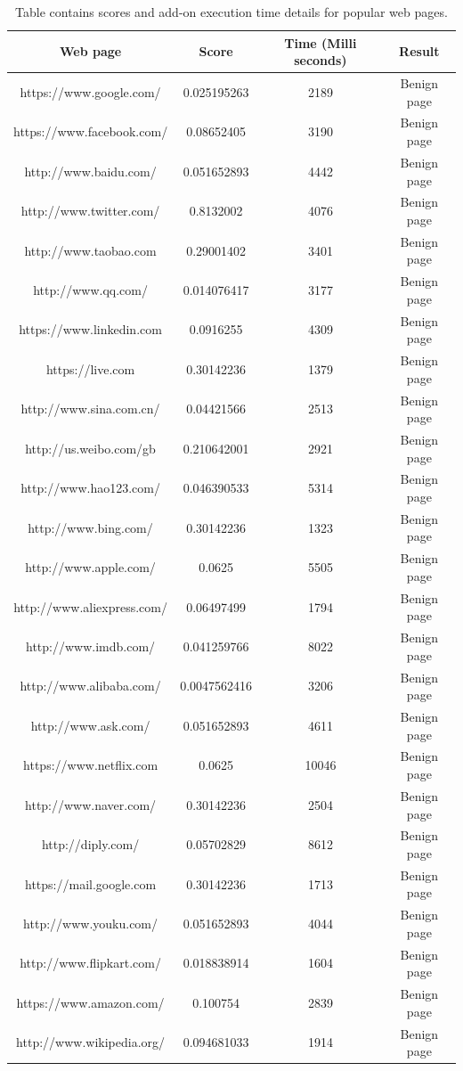 \begin{table}[h]
\caption[Scores table for popular web pages]{Table contains scores and add-on execution time details for popular web pages. }
    \label{tab:scoresummarytablep}
  \centering
  \begin{tabular}{|c|c|c|c|} 
  \midrule
 Web page& Score& Time (Milli seconds) & Result\\
  \midrule
https://www.google.com/&0.025195263&2189&Benign page\\
\midrule
https://www.facebook.com/&0.08652405&3190&Benign page\\
\midrule
http://www.baidu.com/&0.051652893&4442&Benign page\\
\midrule
http://www.twitter.com/&0.8132002&4076&Benign page\\
\midrule
http://www.taobao.com&0.29001402&3401&Benign page\\
\midrule
http://www.qq.com/&0.014076417&3177&Benign page\\
\midrule
https://www.linkedin.com&0.0916255&4309&Benign page\\
\midrule
https://live.com&0.30142236&1379&Benign page\\
\midrule
http://www.sina.com.cn/&0.04421566&2513&Benign page\\
\midrule
http://us.weibo.com/gb&0.210642001&2921&Benign page\\
\midrule
http://www.hao123.com/&0.046390533&5314&Benign page\\
\midrule
http://www.bing.com/&0.30142236&1323&Benign page\\
\midrule
http://www.apple.com/&0.0625&5505&Benign page\\
\midrule
http://www.aliexpress.com/&0.06497499&1794&Benign page\\
\midrule
http://www.imdb.com/&0.041259766&8022&Benign page\\
\midrule
http://www.alibaba.com/&0.0047562416&3206&Benign page\\
\midrule
http://www.ask.com/&0.051652893&4611&Benign page\\
\midrule
https://www.netflix.com&0.0625&10046&Benign page\\
\midrule
http://www.naver.com/&0.30142236&2504&Benign page\\
\midrule
http://diply.com/&0.05702829&8612&Benign page\\
\midrule
https://mail.google.com&0.30142236&1713&Benign page\\
\midrule
http://www.youku.com/&0.051652893&4044&Benign page\\
\midrule
http://www.flipkart.com/&0.018838914&1604&Benign page\\
\midrule
https://www.amazon.com/&0.100754&2839&Benign page\\
\midrule
http://www.wikipedia.org/&0.094681033&1914&Benign page\\
\midrule
\end{tabular}
    
\end{table}

